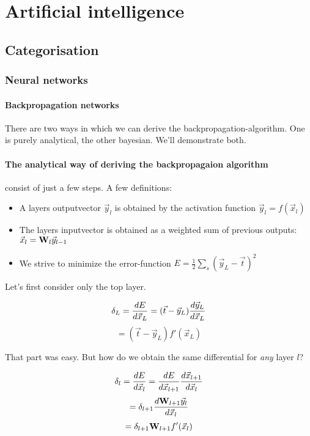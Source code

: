 \section{Artificial intelligence}

\subsection{Categorisation}

\subsubsection{Neural networks}

\paragraph{Backpropagation networks}

There are two ways in which we can derive the backpropagation-algorithm. One is purely analytical, the other bayesian. We'll demonstrate both. 

\paragraph{The analytical way of deriving the backpropagaion algorithm} consist of just a few steps. 
A few definitions: 

\begin{itemize}
	\item A layers outputvector $\vec{y}_l$ is obtained by the activation function $\vec{y}_l = f(\vec{x}_l) $
	\item The layers inputvector is obtained as a weighted sum of previous outputs: $\vec{x}_l = \mathbf{W}_l \vec{y}_{l-1} $
	\item We strive to minimize the error-function $E = \frac{1}{2} \sum_s (\vec{y}_L - \vec{t})^2 $
\end{itemize}

Let's first consider only the top layer. 

$$ \delta_L =  \frac{ \mathop{dE} }{ \mathop{d\vec{x}_L} }  = (\vec{t} - \vec{y}_L)  \frac{ \mathop{d\vec{y}_L} }{ \mathop{d\vec{x}_L} }  $$
$$ = (\vec{t} - \vec{y}_L) f'(\vec{x}_L) $$

That part was easy. But how do we obtain the same differential for \emph{any} layer $l$?

$$ \delta_l =  \frac{ \mathop{dE} }{ \mathop{d\vec{x}_l} }  =  \frac{ \mathop{dE} }{ \mathop{d\vec{x}_{l+1}} }   \frac{ \mathop{d\vec{x}_{l+1}} }{ \mathop{d\vec{x}_{l}} }  $$
$$ = \delta_{l+1}  \frac{ \mathop{d \mathbf{W}_{l+1} \vec{y}_{l}} }{ \mathop{d\vec{x}_{l}} }  $$
$$ = \delta_{l+1} \mathbf{W}_{l+1} f'(\vec{x}_l) $$ 

